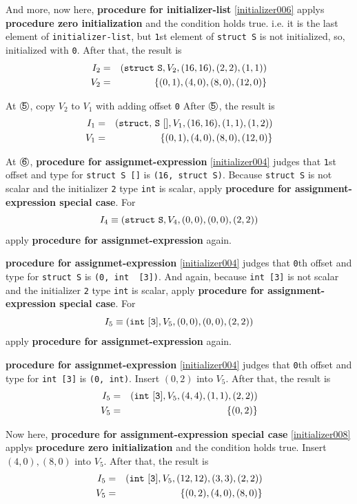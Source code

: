 \begin{Example}
And more, now here, {\bf procedure for initializer-list} \ref{initializer006}
applys {\bf procedure zero initialization}
and the condition holds true. i.e. it is the last element of
 {\tt{initializer-list}}, but {\tt{1}}st element of {\tt{struct S}} is not
 initialized, so, initialized with {\tt{0}}.
After that, the result is
\begin{eqnarray*}
I_2 & = & ({\tt{struct\,\,S}}, V_2, (16,16),(2,2),(1,1)) \\
V_2 & = & \{(0,1), (4,0), (8,0), (12,0)\}
\end{eqnarray*}


\noindent
At $\MARU{\tt 5}$, copy $V_2$ to $V_1$ with adding offset {\tt{0}}
After $\MARU{\tt 5}$, the result is
\begin{eqnarray*}
I_1 & = & ({\tt{struct,\,S\,\,[]}},V_1,(16,16),(1,1),(1,2)) \\
V_1 & = & \{(0,1), (4,0), (8,0), (12,0)\}
\end{eqnarray*}

\noindent
At $\MARU{\tt 6}$,
{\bf procedure for assignmet-expression}
\ref{initializer004} judges that
{\tt{1}}st offset and type for {\tt struct S []} is
{\tt (16, struct S)}.
Because {\tt struct S} is not scalar and the initializer {\tt{2}}
type {\tt int} is scalar, apply
 {\bf procedure for assignment-expression special case}. For
\[
I_4 \equiv ({\tt{struct\,\,S}},V_4,(0,0),(0,0),(2,2))
\]
apply {\bf procedure for assignmet-expression} again.

{\bf procedure for assignmet-expression}
\ref{initializer004} judges that
{\tt{0}}th offset and type for {\tt struct S} is {\tt (0, int\,\,[3])}.
And again, because
{\tt int [3]} is not scalar and the initializer {\tt{2}}
type {\tt int} is scalar, apply
 {\bf procedure for assignment-expression special case}. For
\[
I_5 \equiv ({\tt{int\,\,[3]}},V_5,(0,0),(0,0),(2,2))
\]
apply {\bf procedure for assignmet-expression} again.

{\bf procedure for assignmet-expression}
\ref{initializer004} judges that
{\tt{0}}th offset and type for {\tt int [3]}
is {\tt (0, int)}.
Insert $(0,2)$ into $V_5$.
After that, the result is
\begin{eqnarray*}
I_5 & = & ({\tt{int\,\,[3]}},V_5,(4,4),(1,1),(2,2)) \\
V_5 & = & \{(0,2)\}
\end{eqnarray*}

Now here,
{\bf procedure for assignment-expression special case} \ref{initializer008}
applys {\bf procedure zero initialization}
and the condition holds true. Insert $(4,0),(8,0)$ into $V_5$.
After that, the result is
\begin{eqnarray*}
I_5 & = & ({\tt{int\,\,[3]}},V_5,(12,12),(3,3),(2,2)) \\
V_5 & = & \{(0,2), (4,0), (8,0) \}
\end{eqnarray*}


\end{Example}
